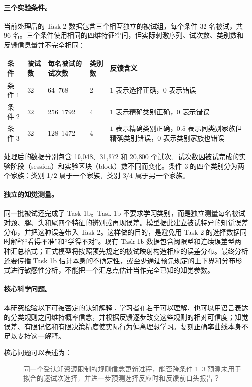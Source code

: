 \paragraph{三个实验条件。}
当前处理后的 Task 2 数据包含三个相互独立的被试组，每个条件 32 名被试，共 96 名。三个条件使用相同的四维特征空间，但实际刺激序列、试次数、类别数和反馈信息量并不完全相同：
\begin{center}
\small
\begin{tabular}{p{}|p{}|p{}|p{}|p{}}
\hline
条件 & 被试数 & 每名被试的试次数 & 类别数 & 反馈含义\\
\hline
条件 1 & 32 & 64--768 & 2 & $1$ 表示选择正确，$0$ 表示错误\\
条件 2 & 32 & 256--1792 & 4 & $1$ 表示精确类别正确，$0$ 表示错误\\
条件 3 & 32 & 128--1472 & 4 & $1$ 表示精确类别正确，$0.5$ 表示同类别家族但精确类别错误，$0$ 表示类别家族也错误\\
\hline
\end{tabular}
\normalsize
\end{center}
处理后的数据分别包含 10,048、31,872 和 20,800 个试次。试次数因被试完成的实验阶段（session）和实验区块（block）数不同而变化。条件 3 的四个类别分为两个家族：类别 1/2 属于一个家族，类别 3/4 属于另一个家族。

\paragraph{独立的知觉测量。}
同一批被试还完成了 Task 1b。Task 1b 不要求学习类别，而是独立测量每名被试对颈、腿、头和尾四个特征的辨别或再现误差。模型据此建立被试特异的知觉误差分布，并把这种误差带入 Task 2。这样做的目的，是避免用 Task 2 的选择数据同时解释“看得不准”和“学得不对”。现有 Task 1b 数据包含阈限型和连续误差型两种汇总格式；正式模型将按照预先规定的被试映射构造相应的误差分布。最终分析还要传播 Task 1b 估计本身的不确定性，或至少通过预先规定的上下界和分布形式进行敏感性分析，不能把一个汇总点估计当作完全已知的知觉参数。

\paragraph{核心科学问题。}
本研究检验以下可被否定的认知解释：学习者在若干可以理解、也可以用语言表达的分类规则之间维持概率信念，并根据反馈逐步改变这些规则的相对可信度；知觉误差、有限记忆和有限决策精度使实际行为偏离理想学习。复刻正确率曲线本身不足以支持这一解释。

核心问题可以表述为：
\begin{quote}
同一个受认知资源限制的规则信念更新过程，能否跨条件 1--3 预测未用于拟合的逐试次选择，并进一步预测选择反应时和反馈前口头报告？
\end{quote}

